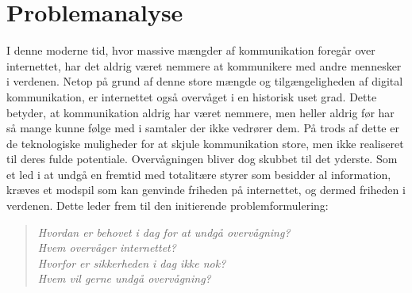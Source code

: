 \section{Problemanalyse}
I denne moderne tid, hvor massive mængder af kommunikation foregår over internettet, har det aldrig været nemmere at kommunikere med andre mennesker i verdenen. Netop på grund af denne store mængde og tilgængeligheden af digital kommunikation, er internettet også overvåget i en historisk uset grad. Dette betyder, at kommunikation aldrig har været nemmere, men heller aldrig før har så mange kunne følge med i samtaler der ikke vedrører dem. På trods af dette er de teknologiske muligheder for at skjule kommunikation store, men ikke realiseret til deres fulde potentiale. Overvågningen bliver dog skubbet til det yderste. Som et led i at undgå en fremtid med totalitære styrer som besidder al information, kræves et modspil som kan genvinde friheden på internettet, og dermed friheden i verdenen. Dette leder frem til den initierende problemformulering:
\begin{quote}
\textit{Hvordan er behovet i dag for at undgå overvågning?\\
Hvem overvåger internettet?\\
Hvorfor er sikkerheden i dag ikke nok?\\
Hvem vil gerne undgå overvågning?}
\end{quote}

\newpage



\newpage